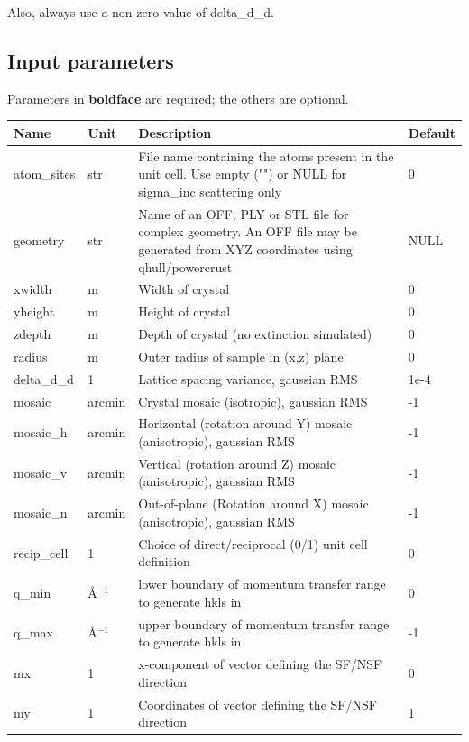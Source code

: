 Also, always use a non-zero value of delta\_d\_d.

\subsection*{Input parameters}
Parameters in \textbf{boldface} are required; the others are optional.

\begin{longtable}{p{}p{}p{}p{}}
\toprule
\textbf{Name} & \textbf{Unit} & \textbf{Description} & \textbf{Default} \\
\midrule
\endhead
atom\_sites & str & File name containing the atoms present in the unit cell. Use empty ("") or NULL for sigma\_inc scattering only & 0 \\
geometry & str & Name of an OFF, PLY or STL file for complex geometry. An OFF file may be generated from XYZ coordinates using qhull/powercrust & NULL \\
xwidth & m & Width of crystal & 0 \\
yheight & m & Height of crystal & 0 \\
zdepth & m & Depth of crystal (no extinction simulated) & 0 \\
radius & m & Outer radius of sample in (x,z) plane & 0 \\
delta\_d\_d & 1 & Lattice spacing variance, gaussian RMS & 1e-4 \\
mosaic & arcmin & Crystal mosaic (isotropic), gaussian RMS & -1 \\
mosaic\_h & arcmin & Horizontal (rotation around Y) mosaic (anisotropic), gaussian RMS & -1 \\
mosaic\_v & arcmin & Vertical (rotation around Z) mosaic (anisotropic), gaussian RMS & -1 \\
mosaic\_n & arcmin & Out-of-plane (Rotation around X) mosaic (anisotropic), gaussian RMS & -1 \\
recip\_cell & 1 & Choice of direct/reciprocal (0/1) unit cell definition & 0 \\
q\_min & \AA{}$^{-1}$ & lower boundary of momentum transfer range to generate hkls in & 0 \\
q\_max & \AA{}$^{-1}$ & upper boundary of momentum transfer range to generate hkls in & -1 \\
mx & 1 & x-component of vector defining the SF/NSF direction & 0 \\
my & 1 & Coordinates of vector defining the SF/NSF direction & 1 \\

\end{longtable}
